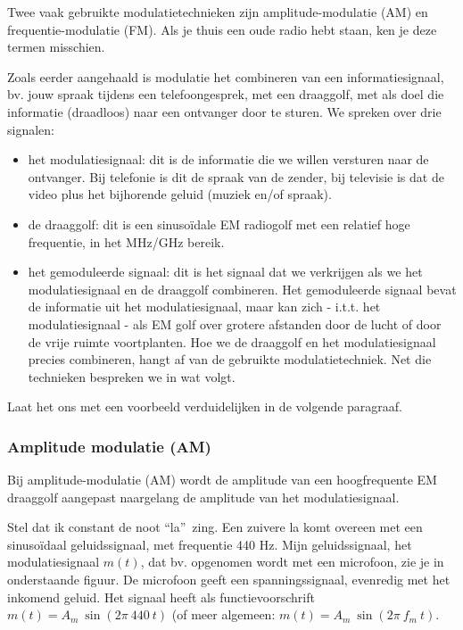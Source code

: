 Twee vaak gebruikte modulatietechnieken zijn amplitude-modulatie (AM) en frequentie-modulatie (FM). Als je thuis een oude radio hebt staan, ken je deze termen misschien.

Zoals eerder aangehaald is modulatie het combineren van een informatiesignaal, bv. jouw spraak tijdens een telefoongesprek, met een draaggolf, met als doel die informatie (draadloos) naar een ontvanger door te sturen. We spreken over drie signalen:
\begin{itemize}
    \item het modulatiesignaal: dit is de informatie die we willen versturen naar de ontvanger. Bij telefonie is dit de spraak van de zender, bij televisie is dat de video plus het bijhorende geluid (muziek en/of spraak). 
    \item de draaggolf: dit is een sinuso\"idale EM radiogolf met een relatief hoge frequentie, in het MHz/GHz bereik. 
    \item het gemoduleerde signaal: dit is het signaal dat we verkrijgen als we het modulatiesignaal en de draaggolf combineren. Het gemoduleerde signaal bevat de informatie uit het modulatiesignaal, maar kan zich - i.t.t. het modulatiesignaal - als EM golf over grotere afstanden door de lucht of door de vrije ruimte voortplanten. Hoe we de draaggolf en het modulatiesignaal precies combineren, hangt af van de gebruikte modulatietechniek. Net die technieken bespreken we in wat volgt.
\end{itemize}

Laat het ons met een voorbeeld verduidelijken in de volgende paragraaf.

\subsubsection{Amplitude modulatie (AM)}

Bij amplitude-modulatie (AM) wordt de amplitude van een hoogfrequente EM draaggolf aangepast naargelang de amplitude van het modulatiesignaal.

Stel dat ik constant de noot \textquotedblleft la\textquotedblright \ zing. Een zuivere la komt overeen met een sinuso\"idaal geluidssignaal, met frequentie 440 Hz. Mijn geluidssignaal, het modulatiesignaal $m(t)$, dat bv. opgenomen wordt met een microfoon, zie je in onderstaande figuur. De microfoon geeft een spanningssignaal, evenredig met het inkomend geluid. Het signaal heeft als functievoorschrift $m(t) = A_m ~ \sin (2 \pi~ 440~ t)$ (of meer algemeen: $m(t) = A_m ~ \sin (2 \pi~ f_m~ t)$.

